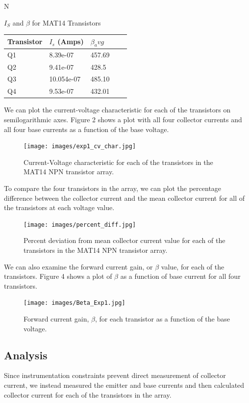 N\documentclass{article}
\begin{document}
\begin{table}[h]
\centering
$I_S$ and $\beta$ for MAT14 Transistors
\\
\begin{tabular}{|l|l|l|l|l|}

\hline
Transistor & $I_s$ (Amps) & $\beta_avg$    \\ \hline
Q1 & 8.39e-07&  457.69 \\ \hline
Q2 & 9.41e-07 &  428.5   \\ \hline
Q3 & 10.054e-07 &  485.10\\ \hline
Q4 & 9.53e-07 &  432.01  \\ \hline
\end{tabular}
\end{table}

We can plot the current-voltage characteristic for each of the transistors on semilogarithmic axes. Figure 2 shows a plot with all four collector currents and all four base currents as a function of the base voltage.
\begin{figure}[H]   
  \centering        
  \texttt{[image: images/exp1\_cv\_char.jpg]}
  \caption{Current-Voltage characteristic for each of the transistors in the MAT14 NPN transistor array.}   
  \label{fig:exp1_cv}
\end{figure}

To compare the four transistors in the array, we can plot the percentage difference between the collector current and the mean collector current for all of the transistors at each voltage value.
\begin{figure}[H]   
  \centering        
  \texttt{[image: images/percent\_diff.jpg]}
  \caption{Percent deviation from mean collector current value for each of the transistors in the MAT14 NPN transistor array.}
  \label{fig:exp1_mean_diff}
\end{figure}

We can also examine the forward current gain, or $\beta$ value, for each of the transistors. Figure 4 shows a plot of $\beta$ as a function of base current for all four transistors.
\begin{figure}[H]   
  \centering        
  \texttt{[image: images/Beta\_Exp1.jpg]}
  \caption{Forward current gain, $\beta$, for each transistor as a function of the base voltage.}   
  \label{fig:exp1_beta}
\end{figure}

\subsection{Analysis}
Since instrumentation constraints prevent direct measurement of collector current, we instead measured the emitter and base currents and then calculated collector current for each of the transistors in the array.
\end{document}
